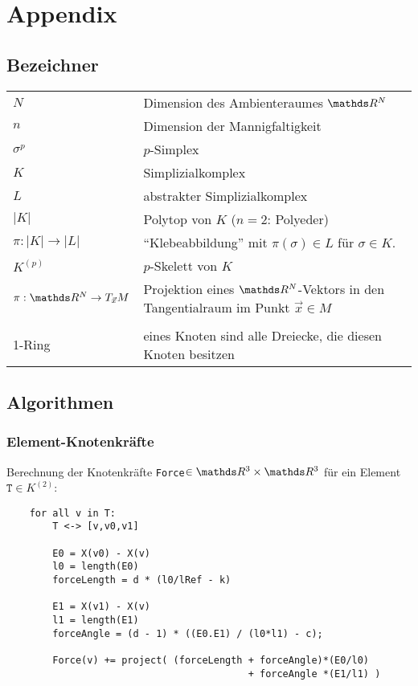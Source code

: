 \newcommand{\trace}{\text{Trace}}


\chapter{Appendix}

\section{Bezeichner}

\begin{tabular}{p{}p{}}
  \( N \) & Dimension des Ambienteraumes \( \R^{N} \) \\
  \( n \) & Dimension der Mannigfaltigkeit \\
  \( \sigma^{p} \) & \( p \)-Simplex \\
  \( K \) & Simplizialkomplex \\
  \( L \) & abstrakter Simplizialkomplex\\
  \( |K| \) & Polytop von \( K \) (\( n=2 \): Polyeder)\\
  \( \pi: |K| \rightarrow |L| \) & "`Klebeabbildung"'  mit \( \pi(\sigma)\in L \) für \( \sigma\in K \). \\
  \( K^{(p)} \) & \( p \)-Skelett von \( K \)\\
  \( \pi: \R^{N}\rightarrow T_{\vec{x}}M \) & Projektion eines \( \R^{N} \)-Vektors in den Tangentialraum im Punkt \( \vec{x}\in M \) \\
  &\\
  1-Ring & eines Knoten sind alle Dreiecke, die diesen Knoten besitzen \\
\end{tabular}


\section{Algorithmen}
  
  
  \subsection{Element-Knotenkräfte}
    \label{AlgoForces}
    Berechnung der Knotenkräfte \texttt{Force}\( \in\R^{3}\times\R^{3} \) für ein Element 
    \(\mathtt{T} \in K^{(2)}\):

    \begin{verbatim}
    for all v in T:
        T <-> [v,v0,v1]
        
        E0 = X(v0) - X(v)
        l0 = length(E0)
        forceLength = d * (l0/lRef - k)

        E1 = X(v1) - X(v)
        l1 = length(E1)
        forceAngle = (d - 1) * ((E0.E1) / (l0*l1) - c);

        Force(v) += project( (forceLength + forceAngle)*(E0/l0) 
                                          + forceAngle *(E1/l1) ) 
    \end{verbatim}

